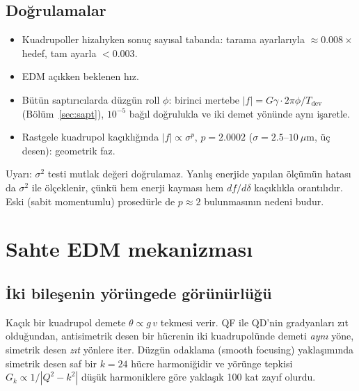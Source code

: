 \documentclass[11pt,a4paper]{article}
\begin{document}
\subsection{Doğrulamalar}\label{sec:benchmark}
\begin{itemize}[nosep]
\item Kuadrupoller hizalıyken sonuç sayısal tabanda: tarama ayarlarıyla $\approx0.008\times$hedef, tam ayarla
$<0.003$.
\item EDM açıkken beklenen hız.
\item Bütün saptırıcılarda düzgün roll $\phi$: birinci mertebe $|f|=G\gamma\cdot2\pi\phi/T_\text{dev}$
(Bölüm~\ref{sec:sapt}), $10^{-5}$ bağıl doğrulukla ve iki demet yönünde aynı işaretle.
\item Rastgele kuadrupol kaçıklığında $|f|\propto\sigma^p$, $p=2.0002$ ($\sigma=2.5$--$10~\mu$m, üç desen):
geometrik faz.
\end{itemize}
Uyarı: $\sigma^2$ testi mutlak değeri doğrulamaz. Yanlış enerjide yapılan ölçümün hatası da $\sigma^2$ ile
ölçeklenir, çünkü hem enerji kayması hem $df/d\delta$ kaçıklıkla orantılıdır. Eski (sabit momentumlu)
prosedürle de $p\approx2$ bulunmasının nedeni budur.

\section{Sahte EDM mekanizması}\label{sec:mekanizma}
\subsection{İki bileşenin yörüngede görünürlüğü}
Kaçık bir kuadrupol demete $\theta\propto g\,v$ tekmesi verir. QF ile QD'nin gradyanları zıt olduğundan,
antisimetrik desen bir hücrenin iki kuadrupolünde demeti \emph{aynı} yöne, simetrik desen \emph{zıt} yönlere
iter. Düzgün odaklama (smooth focusing) yaklaşımında simetrik desen saf bir $k=24$ hücre harmoniğidir ve
yörünge tepkisi $G_k\propto1/|Q^2-k^2|$ düşük harmoniklere göre yaklaşık 100 kat zayıf olurdu.
\end{document}
